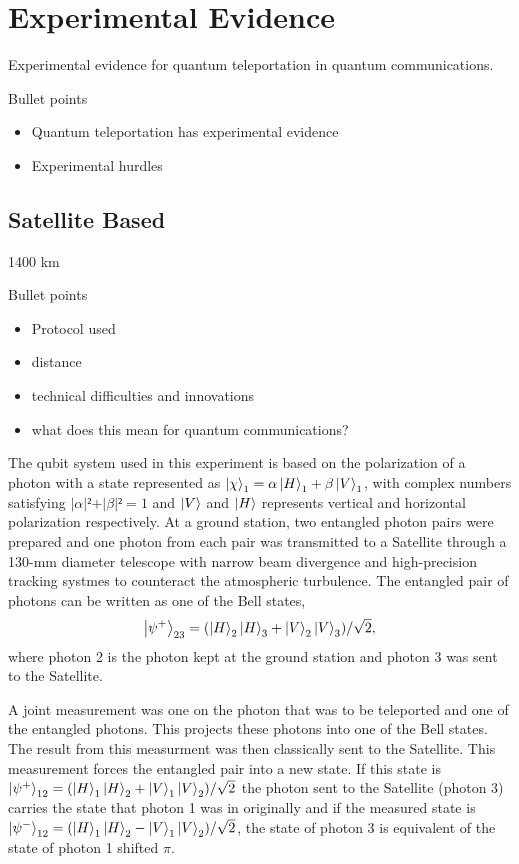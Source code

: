 \section{Experimental Evidence}
Experimental evidence for quantum teleportation in quantum communications.
\begin{mybox}{Bullet points}
    \begin{itemize}
        \item Quantum teleportation has experimental evidence
        \item Experimental hurdles
    \end{itemize}
\end{mybox}
\subsection{Satellite Based}

1400 km \cite{Ren:2017}
\begin{mybox}{Bullet points}
    \begin{itemize}
        \item Protocol used
        \item distance
        \item technical difficulties and innovations
        \item what does this mean for quantum communications?
    \end{itemize}
\end{mybox}

The qubit system used in this experiment is based on the polarization of a photon with a state represented as $\ket{\chi}_1 = \alpha\ket{H}_1 + \beta\ket{V}_1$, with complex numbers
satisfying $\vert\alpha\vert² + \vert\beta\vert² = 1$ and $\ket{V}$ and $\ket{H}$ represents vertical and horizontal polarization respectively.
 At a ground station, two entangled photon pairs were prepared and one photon from each pair was
transmitted to a Satellite through a 130-mm diameter telescope with narrow beam divergence and high-precision tracking systmes to counteract the atmospheric turbulence.
The entangled pair of photons can be written as one of the Bell states,
\begin{equation}
    \ket{\psi^{+}}_{23} = (\ket{H}_2\ket{H}_3 + \ket{V}_2\ket{V}_3)/\sqrt{2},
\end{equation}
where photon 2 is the photon kept at the ground station and photon 3 was sent to the Satellite.

A joint measurement was one on the photon that was to be teleported and one of the entangled photons. This projects these photons into one of the Bell states.
The result from this measurment was then classically sent to the Satellite. This measurement forces the entangled pair into a new state. If this state is 
$\ket{\psi^{+}}_{12} = (\ket{H}_1\ket{H}_2 + \ket{V}_1\ket{V}_2)/\sqrt{2}$ the photon sent to the Satellite (photon 3) carries the state that photon 1 was in originally
and if the measured state is $\ket{\psi^{-}}_{12} = (\ket{H}_1\ket{H}_2 - \ket{V}_1\ket{V}_2)/\sqrt{2}$, the state of photon 3 is equivalent of the state of photon 1 shifted $\pi$.



